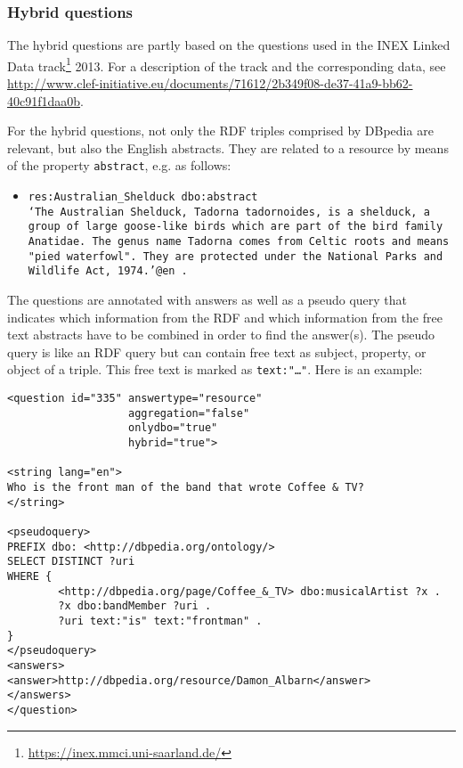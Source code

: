 \subsubsection{Hybrid questions}

The hybrid questions are partly based on the questions used in the INEX Linked Data track\footnote{\url{https://inex.mmci.uni-saarland.de/}} 2013. 
For a description of the track and the corresponding data, 
see \url{http://www.clef-initiative.eu/documents/71612/2b349f08-de37-41a9-bb62-40c91f1daa0b}.

For the hybrid questions, not only the RDF triples comprised by DBpedia are relevant, but also the English abstracts. 
They are related to a resource by means of the property \texttt{abstract}, e.g. as follows:

\begin{itemize}
\item[] \texttt{res:Australian\_Shelduck dbo:abstract \\[.1cm]
    `The Australian Shelduck, Tadorna tadornoides, is a shelduck, \\ 
     a group of large goose-like birds which are part of the bird \\ 
     family Anatidae. The genus name Tadorna comes from Celtic \\ 
     roots and means "pied waterfowl". They are protected under \\ 
     the National Parks and Wildlife Act, 1974.'@en .}
\end{itemize}

The questions are annotated with answers as well as a pseudo query that indicates which information from the RDF and which information 
from the free text abstracts have to be combined in order to find the answer(s). 
The pseudo query is like an RDF query but can contain free text as subject, property, or object of a triple. 
This free text is marked as \texttt{text:"\ldots"}. 
Here is an example: 

\begin{lstlisting}
<question id="335" answertype="resource" 
                   aggregation="false" 
                   onlydbo="true" 
                   hybrid="true">

<string lang="en">
Who is the front man of the band that wrote Coffee & TV?
</string>

<pseudoquery>
PREFIX dbo: <http://dbpedia.org/ontology/>
SELECT DISTINCT ?uri 
WHERE {
        <http://dbpedia.org/page/Coffee_&_TV> dbo:musicalArtist ?x .
        ?x dbo:bandMember ?uri .
        ?uri text:"is" text:"frontman" .
}      
</pseudoquery>
<answers>  
<answer>http://dbpedia.org/resource/Damon_Albarn</answer>
</answers>
</question>
\end{lstlisting}

